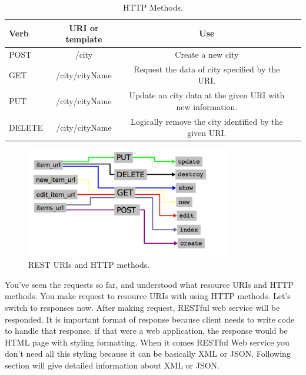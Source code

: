 \begin{table}[!htb]
  \renewcommand{\arraystretch}{1.2} %
  \centering
  \begin{tabular}{lccc}
    \toprule
    Verb           & URI or template & Use  \\
    \midrule
    POST           & /city & Create a new city\\
    GET            & /city/{cityName} & Request the data of city specified by the URI.\\
    PUT            & /city/{cityName} & Update an city data at the given URI with new information.\\
    DELETE         & /city/{cityName} & Logically remove the city identified by the given URI.\\
    \bottomrule
  \end{tabular}
  \caption[HTTP Methods.]{HTTP Methods.}
  \label{tab:aeroCoeff}
\end{table}

\begin{figure}[!htb]
  \centering
  \includegraphics[width=0.8\textwidth]{Figures/rest.png}
  \caption[REST URIs and HTTP methods.]{REST URIs and HTTP methods.}
  \label{fig:rest}
\end{figure}

You've seen the requests so far, and understood what resource URIs and HTTP methods. You make request to resource URIs with using HTTP methods. Let's switch to responses now. After making request, RESTful web service will be responded. It is important format of response because client needs to write code to handle that response. if that were a web application, the response would be HTML page with styling formatting. When it comes RESTful Web service you don't need all this styling because it can be basically XML or JSON. Following section will give detailed information about XML or JSON.
